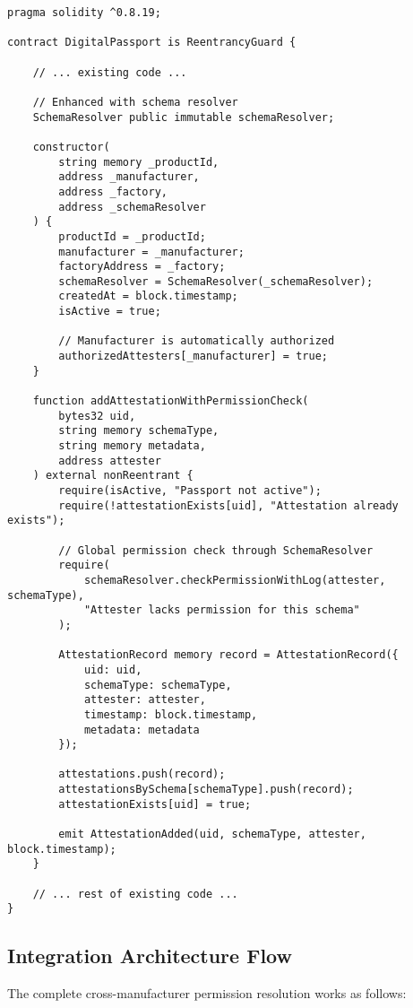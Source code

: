 \documentclass[11pt,a4paper]{article}
\begin{document}
\begin{verbatim}
pragma solidity ^0.8.19;

contract DigitalPassport is ReentrancyGuard {
    
    // ... existing code ...
    
    // Enhanced with schema resolver
    SchemaResolver public immutable schemaResolver;
    
    constructor(
        string memory _productId,
        address _manufacturer,
        address _factory,
        address _schemaResolver
    ) {
        productId = _productId;
        manufacturer = _manufacturer;
        factoryAddress = _factory;
        schemaResolver = SchemaResolver(_schemaResolver);
        createdAt = block.timestamp;
        isActive = true;
        
        // Manufacturer is automatically authorized
        authorizedAttesters[_manufacturer] = true;
    }
    
    function addAttestationWithPermissionCheck(
        bytes32 uid,
        string memory schemaType,
        string memory metadata,
        address attester
    ) external nonReentrant {
        require(isActive, "Passport not active");
        require(!attestationExists[uid], "Attestation already exists");
        
        // Global permission check through SchemaResolver
        require(
            schemaResolver.checkPermissionWithLog(attester, schemaType),
            "Attester lacks permission for this schema"
        );
        
        AttestationRecord memory record = AttestationRecord({
            uid: uid,
            schemaType: schemaType,
            attester: attester,
            timestamp: block.timestamp,
            metadata: metadata
        });
        
        attestations.push(record);
        attestationsBySchema[schemaType].push(record);
        attestationExists[uid] = true;
        
        emit AttestationAdded(uid, schemaType, attester, block.timestamp);
    }
    
    // ... rest of existing code ...
}
\end{verbatim}

\subsection{Integration Architecture Flow}

The complete cross-manufacturer permission resolution works as follows:
\end{document}
